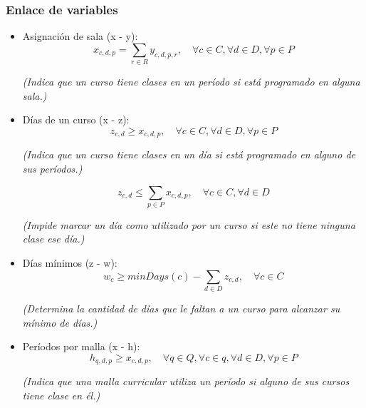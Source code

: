 \documentclass[letter, 10pt]{article}
\begin{document}
\subsubsection{Enlace de variables}
\begin{itemize}

    \item Asignaci\'on de sala (x - y):
    \[
    x_{c,d,p} = \sum_{r \in R} y_{c,d,p,r}, \quad \forall c \in C, \forall d \in D, \forall p \in P
    \]
    \begin{center}
    \begin{minipage}{0.7\textwidth}
    \centering
    \textit{(Indica que un curso tiene clases en un per\'iodo si est\'a programado en alguna sala.)}
    \end{minipage}
    \end{center}

    \item D\'ias de un curso (x - z):
    \[
    z_{c,d} \geq x_{c,d,p}, \quad \forall c \in C, \forall d \in D, \forall p \in P
    \]
    \begin{center}
    \begin{minipage}{0.7\textwidth}
    \centering
    \textit{(Indica que un curso tiene clases en un d\'ia si est\'a programado en alguno de sus per\'iodos.)}
    \end{minipage}
    \end{center}

    \[
    z_{c,d} \leq \sum_{p \in P} x_{c,d,p}, \quad \forall c \in C, \forall d \in D
    \]
    \begin{center}
    \begin{minipage}{0.7\textwidth}
    \centering
    \textit{(Impide marcar un d\'ia como utilizado por un curso si este no tiene ninguna clase ese d\'ia.)}
    \end{minipage}
    \end{center}

    \item D\'ias m\'inimos (z - w):
    \[
    w_c \geq minDays(c) - \sum_{d \in D} z_{c,d}, \quad \forall c \in C
    \]
    \begin{center}
    \begin{minipage}{0.7\textwidth}
    \centering
    \textit{(Determina la cantidad de d\'ias que le faltan a un curso para alcanzar su m\'inimo de d\'ias.)}
    \end{minipage}
    \end{center}

    \item Per\'iodos por malla (x - h):
    \[
    h_{q,d,p} \geq x_{c,d,p}, \quad \forall q \in Q, \forall c \in q, \forall d \in D, \forall p \in P
    \]
    \begin{center}
    \begin{minipage}{0.7\textwidth}
    \centering
    \textit{(Indica que una malla curricular utiliza un per\'iodo si alguno de sus cursos tiene clase en \'el.)}
    \end{minipage}
    \end{center}


\end{itemize}
\end{document}
